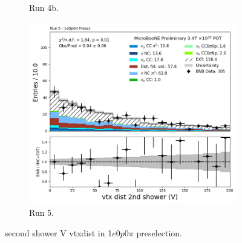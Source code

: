 \begin{figure}[H]
\begin{subfigure}[t]{0.32\linewidth}
        \caption{Run 4b.}
    \end{subfigure}%
    \hspace{0.2cm}%
    \begin{subfigure}[t]{0.32\linewidth}
        \includegraphics[width=\linewidth]{technote/Appendix_Preselection/Figures/1e0p0pi/Run5/secondshower_V_vtxdist_Run5_1e0p0pi_Presel.png}
        \caption{Run 5.}
    \end{subfigure}
    \caption{second shower V vtxdist in 1$e$0$p$0$\pi$ preselection.}
\end{figure}

